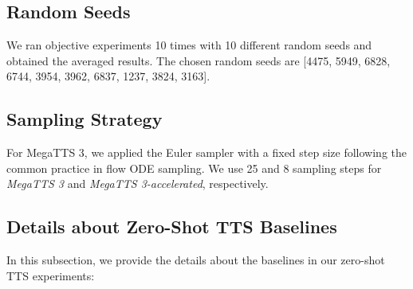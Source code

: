 \subsection{Random Seeds}
\label{app:random_seeds}
We ran objective experiments 10 times with 10 different random seeds and obtained the averaged results. The chosen random seeds are [4475, 5949, 6828, 6744, 3954, 3962, 6837, 1237, 3824, 3163].


\subsection{Sampling Strategy}
For MegaTTS 3, we applied the Euler sampler with a fixed step size following the common practice in flow ODE sampling. We use 25 and 8 sampling steps for \textit{MegaTTS 3} and \textit{MegaTTS 3-accelerated}, respectively.

\subsection{Details about Zero-Shot TTS Baselines}
\label{app:detail_zs_tts_baseline}
In this subsection, we provide the details about the baselines in our zero-shot TTS experiments:

